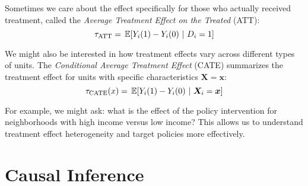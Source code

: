 \documentclass[12pt]{article}
\begin{document}
\begin{multicols}{2}
Sometimes we care about the effect specifically for those who actually received treatment, called the \emph{Average Treatment Effect on the Treated} (ATT):
$$\tau_{\text{ATT}} = \expec{Y_i(1) - Y_i(0)}{D_i = 1}$$

We might also be interested in how treatment effects vary across different types of units.
The \emph{Conditional Average Treatment Effect} (CATE) summarizes the treatment effect for units with specific characteristics $\bm{X} = \bm{x}$:
$$\tau_{\text{CATE}}(x) = \expec{Y_i(1) - Y_i(0)}{\bm{X}_i = \bm{x}}$$

For example, we might ask: what is the effect of the policy intervention for neighborhoods with high income versus low income?
This allows us to understand treatment effect heterogeneity and target policies more effectively.

\section*{Causal Inference}

\begin{figure*}[!tb]
\centering
{}
\end{figure*}
\end{multicols}
\end{document}
